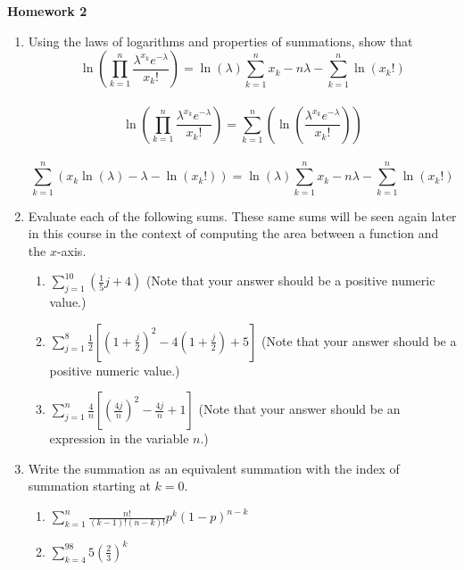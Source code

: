 \documentclass{article}
\begin{document}
    
    \begin{center}
        \large \textbf{Homework 2}
    \end{center}
                    \begin{enumerate}
                        \item Using the laws of logarithms and properties of summations, show that $$\ln\left(\prod_{k=1}^n \frac{\lambda^{x_k}e^{-\lambda}}{x_k!}\right)=\ln(\lambda)\sum_{k=1}^n x_k -n\lambda - \sum_{k=1}^n \ln(x_k!)$$
                        \\$$\ln\left(\prod_{k=1}^n \frac{\lambda^{x_k}e^{-\lambda}}{x_k!}\right)=\sum^{n}_{k=1}\left(\ln(\frac{\lambda^{x_k}e^{-\lambda}}{x_k!})\right)$$
                        \\$$\sum^{n}_{k=1}(x_k\ln(\lambda)-\lambda-\ln(x_{k}!))=\ln(\lambda)\sum^{n}_{k=1}x_k-n\lambda-\sum^{n}_{k=1}\ln(x_{k}!)$$
                        \item Evaluate each of the following sums.  These same sums will be seen again later in this course in the context of computing the area between a function and the $x$-axis.
                            \begin{enumerate}
                                \item $ \sum_{j=1}^{10} \left(\frac{1}{5}j+4\right)$  (Note that your answer should be a positive numeric value.)
                                \item $ \sum_{j=1}^{8} \frac{1}{2}\left[\left(1+\frac{j}{2} \right)^2 -4\left( 1+ \frac{j}{2}\right) + 5\right]$  (Note that your answer should be a positive numeric value.)
                                \item $ \sum_{j=1}^{n} \frac{4}{n}\left[ \left(\frac{4j}{n}\right)^2 - \frac{4j}{n} + 1 \right]$  (Note that your answer should be an expression in the variable $n$.)
                            \end{enumerate}
                        \item Write the summation as an equivalent summation with the index of summation starting at $k=0$.
                            \begin{enumerate}
                                \item $ \sum_{k=1}^n \frac{n!}{(k-1)!(n-k)!}p^k(1-p)^{n-k}$
                                \item $ \sum_{k=4}^{98} 5\left(\frac{2}{3}\right) ^k$
                            \end{enumerate}

\end{enumerate}
\end{document}
